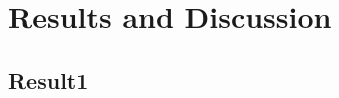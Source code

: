 \section{Results and Discussion}\label{sec:result}
\subsection{Result1}\label{subsec:result1}

\lipsum[1-5]



